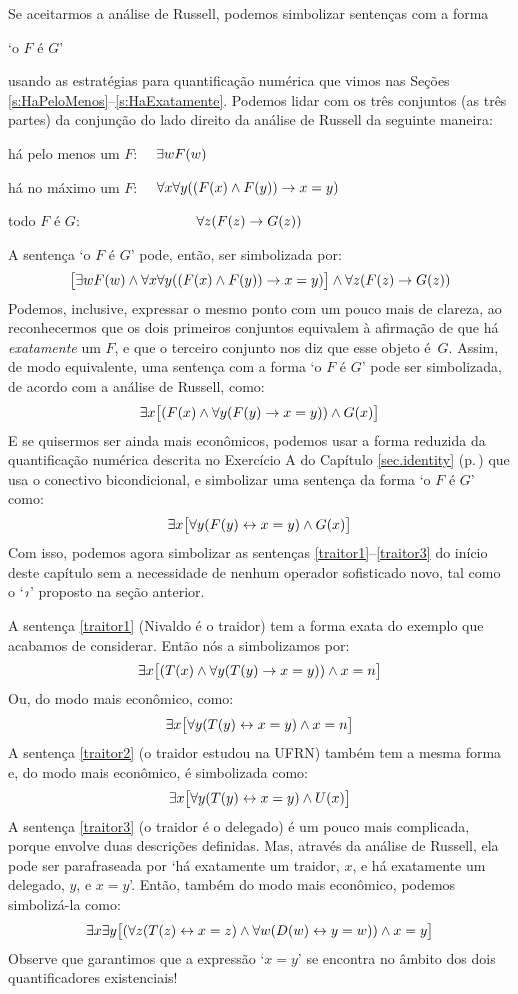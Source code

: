 Se aceitarmos a análise de Russell, podemos simbolizar sentenças com a forma
\begin{center}
	`o $F$ é $G$'
\end{center}
usando as estratégias para quantificação numérica que vimos nas Seções \ref{s:HaPeloMenos}--\ref{s:HaExatamente}.
Podemos lidar com os três conjuntos (as três partes) da conjunção do lado direito da análise de Russell da seguinte maneira:
\begin{ebullet}
	\item há pelo menos um $F$: \ \ $\exists w \mathord{F}(w)$
	\item há no máximo um $F$: \ \  $\forall x \forall y ((\mathord{F}(x) \wedge \mathord{F}(y)) \rightarrow x = y)$
	\item todo $F$ é $G$: \ \ \ \ \ \ \ \ \ \ \ \ \ \ \ \ $\forall z (\mathord{F}(z) \rightarrow \mathord{G}(z))$
\end{ebullet}
A sentença `o $F$ é $G$' pode, então, ser simbolizada por:
	$$\bigl[\exists w \mathord{F}(w) \wedge \forall x \forall y ((\mathord{F}(x) \wedge \mathord{F}(y)) \rightarrow x = y)\bigr] \wedge \forall z (\mathord{F}(z) \rightarrow \mathord{G}(z))$$
Podemos, inclusive, expressar o mesmo ponto com um pouco mais de clareza, ao reconhecermos que os dois primeiros conjuntos equivalem à afirmação de que há \emph{exatamente} um $F$, e que o terceiro conjunto nos diz que esse objeto é~$G$.
Assim, de modo equivalente, uma sentença com a forma `o $F$ é $G$' pode ser simbolizada, de acordo com a análise de Russell, como:
	$$\exists x \bigl[(\mathord{F}(x) \wedge \forall y (\mathord{F}(y) \rightarrow x = y)) \wedge \mathord{G}(x)\bigr]$$
E se quisermos ser ainda mais econômicos, podemos usar a forma reduzida da quantificação numérica descrita no Exercício A  do  Capítulo \ref{sec.identity}  (p.\,\pageref{e:HaExatamenteSee}) que usa o conectivo bicondicional,  e simbolizar uma sentença da forma `o $F$ é $G$' como: 
	$$\exists x \bigl[\forall y(\mathord{F}(y) \leftrightarrow x = y) \wedge \mathord{G}(x)\bigr]$$
Com isso, podemos agora simbolizar as sentenças \ref{traitor1}--\ref{traitor3} do início deste capítulo sem a necessidade de nenhum operador sofisticado novo, tal como o `$\maththe$' proposto na seção anterior.

A sentença \ref{traitor1} (Nivaldo é o traidor) tem a forma exata do exemplo que acabamos de considerar.
Então nós a simbolizamos por:
$$\exists x \bigl[(\mathord{T}(x) \wedge \forall y(\mathord{T}(y) \rightarrow x = y)) \wedge x = n\bigr]$$
Ou, do modo mais econômico, como:
$$\exists x \bigl[\forall y(\mathord{T}(y) \leftrightarrow x = y) \wedge x = n\bigr]$$
A sentença \ref{traitor2} (o traidor estudou na UFRN) também tem a mesma forma e, do modo mais econômico, é simbolizada como:  
$$\exists x \bigl[\forall y(\mathord{T}(y) \leftrightarrow x = y) \wedge \mathord{U}(x)\bigr]$$
A sentença \ref{traitor3} (o traidor é o delegado) é um pouco mais complicada, porque envolve duas descrições definidas.
Mas, através da análise de Russell, ela pode ser parafraseada por
`há exatamente um traidor, $x$, e há exatamente um delegado, $y$, e $x = y$'. Então, também do modo mais econômico, podemos simbolizá-la como: 
$$\exists x \exists y \bigl[(\forall z(\mathord{T}(z) \leftrightarrow x = z) \wedge \forall w(\mathord{D}(w) \leftrightarrow y = w)) \wedge x = y\bigr]$$
Observe que garantimos que a expressão `$x = y$' se encontra no âmbito dos dois quantificadores existenciais!


